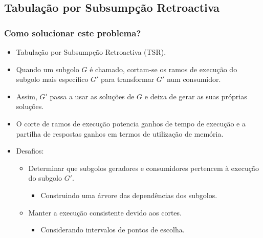 \documentclass{beamer}
\begin{document}
\subsection{Tabulação por Subsumpção Retroactiva}

\begin{frame}
   \frametitle{Como solucionar este problema?}
   \begin{itemize}
      \item Tabulação por Subsumpção Retroactiva (TSR).
      \pause
      \item Quando um subgolo $G$ é chamado, cortam-se os ramos de execução do subgolo mais
      específico $G'$ para transformar $G'$ num consumidor.
      \item Assim, $G'$ passa a usar as soluções de $G$ e deixa de gerar as suas próprias soluções.
      \item O corte de ramos de execução potencia ganhos de tempo de execução e a partilha de respostas ganhos
      em termos de utilização de memória.
      \pause
      \item Desafios:
      \begin{itemize}
         \item Determinar que subgolos geradores e consumidores pertencem à execução do subgolo $G'$.
         \begin{itemize}
            \pause
            \item Construindo uma árvore das dependências dos subgolos.
         \end{itemize}
         \pause
         \item Manter a execução consistente devido aos cortes.
         \begin{itemize}
            \pause
            \item Considerando intervalos de pontos de escolha.
         \end{itemize}
      \end{itemize}
   \end{itemize}
\end{frame}
\end{document}
